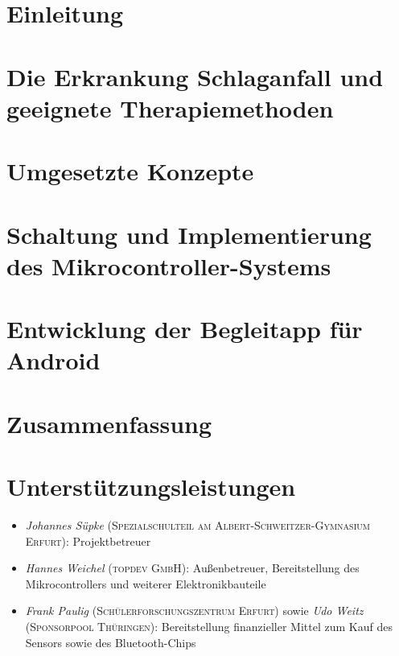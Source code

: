 \documentclass[a4paper, 11pt, titlepage, bibliography=totocnumbered]{scrartcl}
\begin{document}
 \newpage

\tableofcontents
\setcounter{page}{1}
\newpage

\section{Einleitung}


\newpage
\section{Die Erkrankung Schlaganfall und geeignete Therapiemethoden}


\newpage
\section{Umgesetzte Konzepte}


\newpage
\section{Schaltung und Implementierung des Mikrocontroller-Systems}


\section{Entwicklung der Begleitapp für Android}


\newpage
\section{Zusammenfassung}


\newpage


\section*{Unterstützungsleistungen}
\begin{itemize}
	\item \textit{Johannes Süpke} (\textsc{Spezialschulteil am Albert-Schweitzer-Gymnasium Erfurt}): Projektbetreuer
	\item \textit{Hannes Weichel} (\textsc{topdev GmbH}): Außenbetreuer, Bereitstellung des Mikrocontrollers und weiterer Elektronikbauteile
	\item \textit{Frank Paulig} (\textsc{Schülerforschungszentrum Erfurt)} sowie \textit{Udo Weitz} (\textsc{Sponsorpool Thüringen}): Bereitstellung finanzieller Mittel zum Kauf des Sensors sowie des Bluetooth-Chips
\end{itemize}
\end{document}
